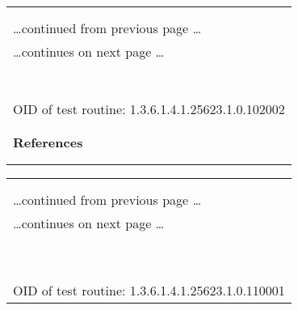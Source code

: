 \documentclass{article}
\begin{document}
\begin{longtable}{|p{}|}
\hline
\rowcolor{openvas_log}{\color{white}{Log (CVSS: 0.0) }}\\
\rowcolor{openvas_log}{\color{white}{NVT: OS fingerprinting}}\\
\hline
\endfirsthead
\hfill\ldots continued from previous page \ldots \\
\hline
\endhead
\hline
\ldots continues on next page \ldots \\
\endfoot
\hline
\endlastfoot
\\
\rowcolor{white}{\verb=ICMP based OS fingerprint results: (95% confidence)=}\\
\rowcolor{white}{\verb=OpenBSD=}\\
\rowcolor{white}{\verb=NetBSD=}\\
\rowcolor{white}{\verb==}\\
\rowcolor{white}{\verb==}\\
\\
OID of test routine: 1.3.6.1.4.1.25623.1.0.102002\\
\\

      \hline
      \\
\textbf{References}\\
\rowcolor{white}{\verb=Other:=}\\
\rowcolor{white}{\verb=  URL:http://www.phrack.org/issues.html?issue=\verb-=-\verb=57&amp;id=\verb-=-\verb=7#article=}\\
\end{longtable}

\begin{longtable}{|p{}|}
\hline
\rowcolor{openvas_log}{\color{white}{Log (CVSS: 0.0) }}\\
\rowcolor{openvas_log}{\color{white}{NVT: arachni (NASL wrapper)}}\\
\hline
\endfirsthead
\hfill\ldots continued from previous page \ldots \\
\hline
\endhead
\hline
\ldots continues on next page \ldots \\
\endfoot
\hline
\endlastfoot
\\
\rowcolor{white}{\verb=Arachni could not be found in your system path.=}\\
\rowcolor{white}{\verb=OpenVAS was unable to execute Arachni and to perform the scan you=}\\
\rowcolor{white}{\verb=requested.=}\\
\rowcolor{white}{\verb=Please make sure that Arachni is installed and that arachni is=}\\
\rowcolor{white}{\verb=available in the PATH variable defined for your environment.=}\\
\rowcolor{white}{\verb==}\\
\rowcolor{white}{\verb==}\\
\\
OID of test routine: 1.3.6.1.4.1.25623.1.0.110001\\
\end{longtable}
\end{document}
